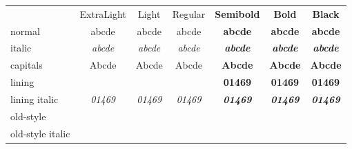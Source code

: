 \documentclass[12pt]{standalone}
\newcommand*\spA{abcde}
\newcommand*\spB{01469}
\newcommand*\spr[1][\spA]{& #1 & #1 & #1 & #1 & #1 & #1 \\}
\begin{document}
\centering
\begin{tabular}{
		>{\sourcecodepro}l
		>{\sourcecodeproextreme}c
		>{\sourcecodeprolight}c
		>{\sourcecodepro}c
		>{\sourcecodeprolight\bfseries}c
		>{\sourcecodepro\bfseries}c
		>{\sourcecodeproextreme\bfseries}c }
	& ExtraLight & Light & Regular & Semibold & Bold & Black \\
	normal               \spr
	italic               \spr[\itshape\spA]
	capitals             \spr[\MakeUppercase\spA]
	lining               \spr[\spB]
	lining italic        \spr[\itshape\spB]
	old-style            \spr[\oldstylenums{\spB}]
	old-style italic     \spr[\oldstylenums{\itshape\spB}]
\end{tabular}
\end{document}
